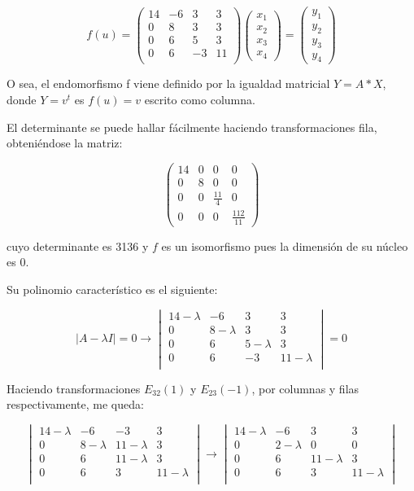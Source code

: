 \documentclass[11pt, a4paper]{article}
\newif\IfInSansMode
\theoremstyle{theorem-style}
\theoremstyle{definition-style}
\theoremstyle{remark-style}
\theoremstyle{example-style}
\begin{document}
$$f(u) = \begin{pmatrix}
14 & -6 & 3 & 3\\
0 & 8 & 3 & 3\\
0 & 6 & 5 & 3\\
0 & 6 & -3 & 11 \\
\end{pmatrix}\begin{pmatrix}
x_1\\
x_2\\
x_3\\
x_4
\end{pmatrix}=
\begin{pmatrix}
y_1\\
y_2\\
y_3\\
y_4
\end{pmatrix}$$

O sea, el endomorfismo f viene definido por la igualdad matricial $Y=A*X$, donde $Y=v^{t}$ es $f(u)=v$ escrito como columna.

El determinante se puede hallar fácilmente haciendo transformaciones fila, obteniéndose la matriz:

$$\begin{pmatrix}
14 & 0 & 0 & 0\\
0 & 8 & 0 & 0\\
0 & 0 & \frac{11}{4} & 0\\
0 & 0 & 0 & \frac{112}{11}
\end{pmatrix}$$

cuyo determinante es 3136 y $f$ es un isomorfismo pues la dimensión de su núcleo es 0.

Su polinomio característico es el siguiente:

$$|A-\lambda I| = 0 \rightarrow 
\begin{vmatrix}
14-\lambda & -6 & 3 & 3\\
0 & 8-\lambda & 3 & 3\\
0 & 6 & 5-\lambda & 3\\
0 & 6 & -3 & 11-\lambda \\ 
\end{vmatrix} = 0 $$

Haciendo transformaciones $E_{32}(1)$ y $E_{23}(-1)$, por columnas y filas respectivamente, me queda:

$$\begin{vmatrix}
	14-\lambda & -6 & -3 & 3\\
	0 & 8-\lambda & 11-\lambda & 3\\
	0 & 6 & 11-\lambda & 3\\
	0 & 6 & 3 & 11-\lambda \\ 
\end{vmatrix} \rightarrow 
\begin{vmatrix}
14-\lambda & -6 & 3 & 3\\
0 & 2-\lambda & 0 & 0\\
0 & 6 & 11-\lambda & 3\\
0 & 6 & 3 & 11-\lambda \\ 
\end{vmatrix}$$
\end{document}
